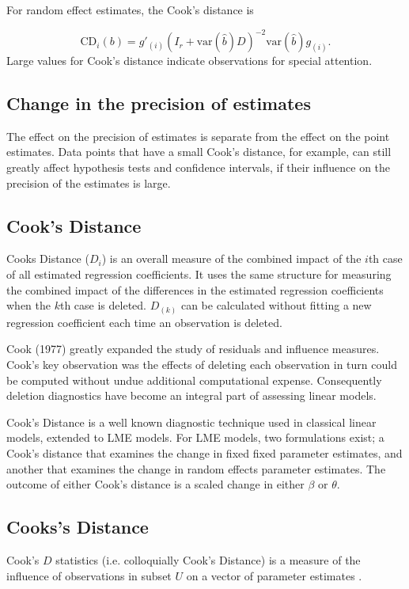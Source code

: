 \documentclass[12pt, a4paper]{article}
\begin{document}
For random effect estimates, the  Cook's distance is


\[
\mbox{CD}_{i}(b) = g{\prime}_{(i)} (I_{r} + \mbox{var}(\hat{b})D)^{-2}\mbox{var}(\hat{b})g_{(i)}.
\]
Large values for Cook's distance indicate observations for special attention.

\subsection{Change in the precision of estimates}

The effect on the precision of estimates is separate from the effect on the point estimates. Data points that
have a small Cook's distance, for example, can still greatly affect hypothesis tests and confidence intervals, if their  influence on the precision of the estimates is large.



\subsection{Cook's Distance}%
Cooks Distance ($D_{i}$) is an overall measure of the combined impact of the $i$th case of all estimated regression coefficients. It uses the same structure for measuring the combined impact of the differences in the estimated regression coefficients when the $k$th case is deleted. $D_{(k)}$ can be calculated without fitting
a new regression coefficient each time an observation is deleted.


Cook (1977) greatly expanded the study of residuals and influence measures. Cook's key observation was the effects of deleting each observation in turn could be computed without undue additional computational expense. Consequently deletion diagnostics have become an integral part of assessing linear models.

Cook's Distance is a well known diagnostic technique used in classical linear models, extended to LME models.  For LME models, two formulations exist; a Cook's distance that examines the change in fixed fixed parameter estimates, and another that examines the change in random effects parameter estimates. The outcome of either Cook's distance is a scaled change in either $\beta$ or $\theta$.




\subsection{Cooks's Distance}%
 Cook's $D$ statistics (i.e. colloquially Cook's Distance) is a measure of the influence of observations in subset $U$ on a vector of parameter estimates \citep{cook77}.
\end{document}
